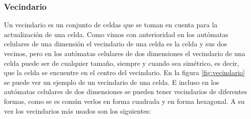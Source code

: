\subsubsection{Vecindario}
    \label{sec:Vecindario}
    Un vecindario es un conjunto de celdas que se toman en cuenta para la actualizaci\'on de una celda. Como vimos con anterioridad
        en los aut\'omatas celulares de una dimensi\'on el vecindario de una celda es la celda y sus dos vecinos, pero en los aut\'omatas
        celulares de dos dimensiones el vecindario de una celda puede ser de cualquier tama\~no, siempre y cuando sea sim\'etrico, es decir,
        que la celda se encuentre en el centro del vecindario. En la figura \ref{fig:vecindario} se puede ver un ejemplo de un vecindario
        de una celda. E incluso en los aut\'omatas celulares de dos dimensiones se pueden tener vecindarios de diferentes formas, como se
        es com\'un verlos en forma cuadrada y en forma hexagonal.
    \vskip 0.5cm
    A su vez los vecindarios m\'as usados son los siguientes: 

